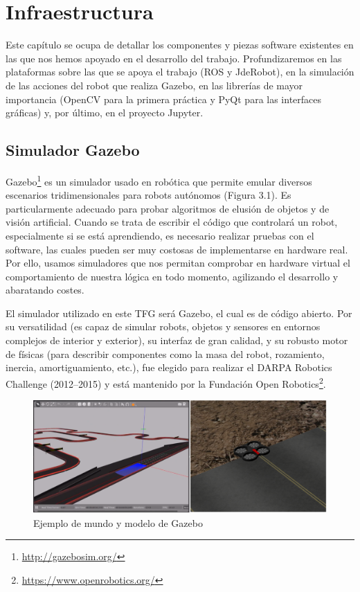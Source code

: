 \chapter{Infraestructura}\label{cap.infraestructura}
Este capítulo se ocupa de detallar  los componentes y piezas software existentes en las que nos hemos apoyado en el desarrollo del trabajo. Profundizaremos en las plataformas sobre las que se apoya el trabajo (ROS y JdeRobot), en la simulación de las acciones del robot que realiza Gazebo, en las librerías de mayor importancia (OpenCV para la primera práctica y PyQt para las interfaces gráficas) y, por último, en el proyecto Jupyter.

\section{Simulador Gazebo}
Gazebo\footnote{\url{http://gazebosim.org/}} es un simulador usado en robótica que permite emular diversos escenarios tridimensionales para robots autónomos (Figura 3.1). Es particularmente adecuado para probar algoritmos de elusión de objetos y de visión artificial. Cuando se trata de escribir el código que controlará un robot, especialmente si se está aprendiendo, es necesario realizar pruebas con el software, las cuales pueden ser muy costosas de implementarse en hardware real. Por ello, usamos simuladores que nos permitan comprobar en hardware virtual el comportamiento de nuestra lógica en todo momento, agilizando el desarrollo y abaratando costes. 

El simulador utilizado en este TFG será Gazebo, el cual es de código abierto. Por su versatilidad (es capaz de simular robots, objetos y sensores en entornos complejos de interior y exterior), su interfaz de gran calidad, y su robusto motor de físicas (para describir componentes como la masa del robot, rozamiento, inercia, amortiguamiento, etc.), fue elegido para realizar el DARPA Robotics Challenge (2012–2015) y está mantenido por la Fundación Open Robotics\footnote{\url{https://www.openrobotics.org/}}.

\begin{figure}[H]
  \begin{center}
    \includegraphics[width=0.9\linewidth]{figures/gazeboworlds.png}
		\caption{Ejemplo de mundo y modelo de Gazebo}
		\label{fig.worlds}
		\end{center}
\end{figure}

